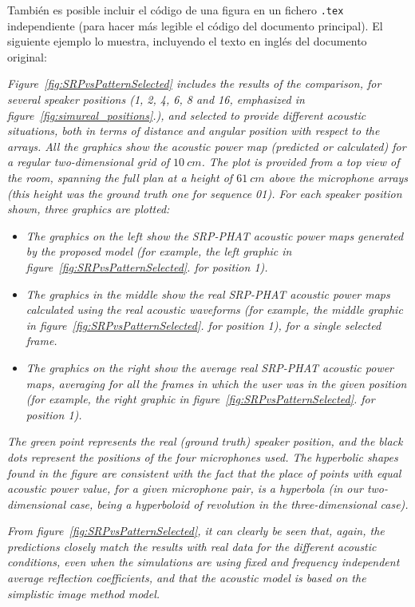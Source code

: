 También es posible incluir el código de una figura en un fichero \texttt{.tex} independiente (para hacer más legible el código del documento principal). El siguiente ejemplo lo muestra, incluyendo el texto en inglés del documento original:

\emph{Figure~\ref{fig:SRPvsPatternSelected} includes the results of the comparison, for several speaker positions (1, 2, 4, 6, 8 and 16, emphasized in figure~\ref{fig:simureal_positions}.), and selected to provide different acoustic situations, both in terms of distance and angular position with respect to the arrays. All the graphics show the acoustic power map (predicted or calculated) for a regular two-dimensional grid of $10~cm$. The plot is provided from a top view of the room, spanning the full plan at a height of $61~cm$ above the microphone arrays (this height was the ground truth one for sequence 01). For each speaker position shown, three graphics are plotted:}

\begin{itemize}
  \item \emph{The graphics on the left show the SRP-PHAT acoustic power maps generated by the proposed model (for example, the left graphic in figure~\ref{fig:SRPvsPatternSelected}. for position 1).}
  \item \emph{The graphics in the middle show the real SRP-PHAT acoustic power maps calculated using the real acoustic waveforms (for example, the middle graphic in figure~\ref{fig:SRPvsPatternSelected}. for position 1), for a single selected frame.}
  \item \emph{The graphics on the right show the average real SRP-PHAT acoustic power maps, averaging for all the frames in which the user was in the given position (for example, the right graphic in figure~\ref{fig:SRPvsPatternSelected}. for position 1).}
\end{itemize}

\emph{The green point represents the real (ground truth) speaker position, and the black dots represent the positions of the four microphones used. The hyperbolic shapes found in the figure are consistent with the fact that the place of points with equal acoustic power value, for a given microphone pair, is a hyperbola (in our two-dimensional case, being a hyperboloid of revolution in the three-dimensional case).}

\emph{From figure~\ref{fig:SRPvsPatternSelected}, it can clearly be seen that, again, the predictions closely match the results with real data for the different acoustic conditions, even when the simulations are using fixed and frequency independent average reflection coefficients, and that the acoustic model is based on the simplistic image method model.}

